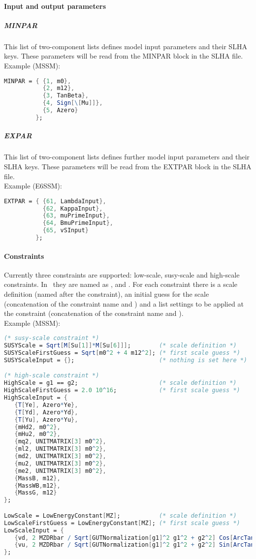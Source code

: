 \paragraph{Input and output parameters}

\subparagraph{MINPAR} This list of two-component lists defines model
input parameters and their SLHA keys.  These parameters will be read
from the MINPAR block in the SLHA file.
\\
Example (MSSM):
\begin{lstlisting}[language=Mathematica]
MINPAR = { {1, m0},
           {2, m12},
           {3, TanBeta},
           {4, Sign[\[Mu]]},
           {5, Azero}
         };
\end{lstlisting}

\subparagraph{EXPAR} This list of two-component lists defines further
model input parameters and their SLHA keys.  These parameters will be
read from the EXTPAR block in the SLHA file.
\\
Example (E6SSM):
\begin{lstlisting}[language=Mathematica]
EXTPAR = { {61, LambdaInput},
           {62, KappaInput},
           {63, muPrimeInput},
           {64, BmuPrimeInput},
           {65, vSInput}
         };
\end{lstlisting}

\paragraph{Constraints}
Currently three constraints are supported: low-scale, susy-scale and
high-scale constraints.  In \flexisusy\ they are named as
,  and .  For
each constraint there is a scale definition (named after the
constraint), an initial guess for the scale (concatenation of the
constraint name and ) and a list settings to be
applied at the constraint (concatenation of the constraint name and
).
\\
Example (MSSM):
\begin{lstlisting}[language=Mathematica]
(* susy-scale constraint *)
SUSYScale = Sqrt[M[Su[1]]*M[Su[6]]];        (* scale definition *)
SUSYScaleFirstGuess = Sqrt[m0^2 + 4 m12^2]; (* first scale guess *)
SUSYScaleInput = {};                        (* nothing is set here *)

(* high-scale constraint *)
HighScale = g1 == g2;                       (* scale definition *)
HighScaleFirstGuess = 2.0 10^16;            (* first scale guess *)
HighScaleInput = {
   {T[Ye], Azero*Ye},
   {T[Yd], Azero*Yd},
   {T[Yu], Azero*Yu},
   {mHd2, m0^2},
   {mHu2, m0^2},
   {mq2, UNITMATRIX[3] m0^2},
   {ml2, UNITMATRIX[3] m0^2},
   {md2, UNITMATRIX[3] m0^2},
   {mu2, UNITMATRIX[3] m0^2},
   {me2, UNITMATRIX[3] m0^2},
   {MassB, m12},
   {MassWB,m12},
   {MassG, m12}
};

LowScale = LowEnergyConstant[MZ];           (* scale definition *)
LowScaleFirstGuess = LowEnergyConstant[MZ]; (* first scale guess *)
LowScaleInput = {
   {vd, 2 MZDRbar / Sqrt[GUTNormalization[g1]^2 g1^2 + g2^2] Cos[ArcTan[TanBeta]]},
   {vu, 2 MZDRbar / Sqrt[GUTNormalization[g1]^2 g1^2 + g2^2] Sin[ArcTan[TanBeta]]}
};
\end{lstlisting}


